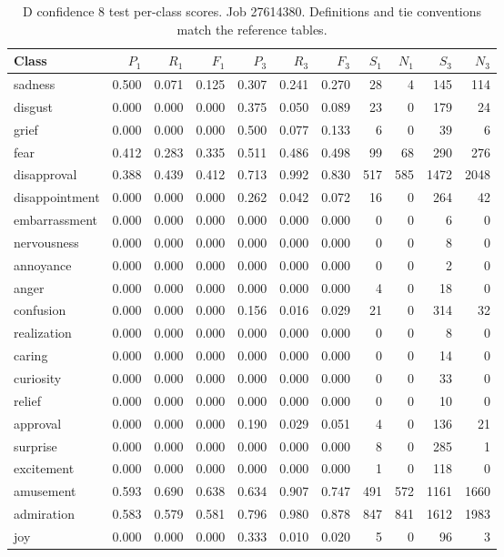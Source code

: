 \begin{table}[!htbp]
\centering
\scriptsize
\setlength{\tabcolsep}{5pt}
\begin{tabular}{lrrrrrrrrrr}
\toprule
Class & $P_1$ & $R_1$ & $F_1$ & $P_3$ & $R_3$ & $F_3$ & $S_1$ & $N_1$ & $S_3$ & $N_3$ \\
\midrule
sadness & 0.500 & 0.071 & 0.125 & 0.307 & 0.241 & 0.270 & 28 & 4 & 145 & 114 \\
disgust & 0.000 & 0.000 & 0.000 & 0.375 & 0.050 & 0.089 & 23 & 0 & 179 & 24 \\
grief & 0.000 & 0.000 & 0.000 & 0.500 & 0.077 & 0.133 & 6 & 0 & 39 & 6 \\
fear & 0.412 & 0.283 & 0.335 & 0.511 & 0.486 & 0.498 & 99 & 68 & 290 & 276 \\
disapproval & 0.388 & 0.439 & 0.412 & 0.713 & 0.992 & 0.830 & 517 & 585 & 1472 & 2048 \\
disappointment & 0.000 & 0.000 & 0.000 & 0.262 & 0.042 & 0.072 & 16 & 0 & 264 & 42 \\
embarrassment & 0.000 & 0.000 & 0.000 & 0.000 & 0.000 & 0.000 & 0 & 0 & 6 & 0 \\
nervousness & 0.000 & 0.000 & 0.000 & 0.000 & 0.000 & 0.000 & 0 & 0 & 8 & 0 \\
annoyance & 0.000 & 0.000 & 0.000 & 0.000 & 0.000 & 0.000 & 0 & 0 & 2 & 0 \\
anger & 0.000 & 0.000 & 0.000 & 0.000 & 0.000 & 0.000 & 4 & 0 & 18 & 0 \\
confusion & 0.000 & 0.000 & 0.000 & 0.156 & 0.016 & 0.029 & 21 & 0 & 314 & 32 \\
realization & 0.000 & 0.000 & 0.000 & 0.000 & 0.000 & 0.000 & 0 & 0 & 8 & 0 \\
caring & 0.000 & 0.000 & 0.000 & 0.000 & 0.000 & 0.000 & 0 & 0 & 14 & 0 \\
curiosity & 0.000 & 0.000 & 0.000 & 0.000 & 0.000 & 0.000 & 0 & 0 & 33 & 0 \\
relief & 0.000 & 0.000 & 0.000 & 0.000 & 0.000 & 0.000 & 0 & 0 & 10 & 0 \\
approval & 0.000 & 0.000 & 0.000 & 0.190 & 0.029 & 0.051 & 4 & 0 & 136 & 21 \\
surprise & 0.000 & 0.000 & 0.000 & 0.000 & 0.000 & 0.000 & 8 & 0 & 285 & 1 \\
excitement & 0.000 & 0.000 & 0.000 & 0.000 & 0.000 & 0.000 & 1 & 0 & 118 & 0 \\
amusement & 0.593 & 0.690 & 0.638 & 0.634 & 0.907 & 0.747 & 491 & 572 & 1161 & 1660 \\
admiration & 0.583 & 0.579 & 0.581 & 0.796 & 0.980 & 0.878 & 847 & 841 & 1612 & 1983 \\
joy & 0.000 & 0.000 & 0.000 & 0.333 & 0.010 & 0.020 & 5 & 0 & 96 & 3 \\
\bottomrule
\end{tabular}
\caption{D confidence 8 test per-class scores. Job 27614380. Definitions and tie conventions match the reference tables.}
\label{tab:classes-d_confidence_k8}
\end{table}
